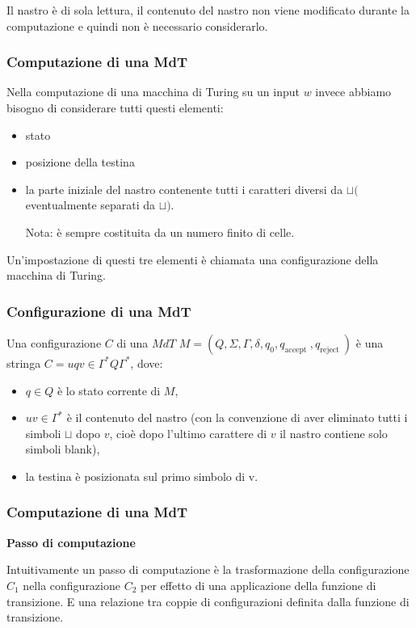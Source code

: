 Il nastro è di sola lettura, il contenuto del nastro non viene modificato durante la computazione e quindi non è necessario considerarlo.

\subsubsection{Computazione di una MdT}

Nella computazione di una macchina di Turing su un input $w$ invece abbiamo bisogno di considerare tutti questi elementi:
\begin{itemize}
    \item stato
    \item posizione della testina
    \item la parte iniziale del nastro contenente tutti i caratteri diversi da $\sqcup($ eventualmente separati da $\sqcup)$.
    
Nota: è sempre costituita da un numero finito di celle.
\end{itemize}

Un'impostazione di questi tre elementi è chiamata una configurazione della macchina di Turing.

\subsubsection{Configurazione di una MdT}

Una configurazione $C$ di una $M d T$
$M=\left(Q, \Sigma, \Gamma, \delta, q_{0}, q_{\text {accept }}, q_{\text {reject }}\right)$ è una stringa
$C=u q v \in \Gamma^{*} Q \Gamma^{*}$, dove:
\begin{itemize}
    \item $q \in Q$ è lo stato corrente di $M$,
    \item $u v \in \Gamma^{*}$ è il contenuto del nastro
(con la convenzione di aver eliminato tutti i simboli $\sqcup$ dopo $v$, cioè dopo l'ultimo carattere di $v$ il nastro contiene solo simboli blank),
    \item la testina è posizionata sul primo simbolo di v.
\end{itemize}

\subsubsection{Computazione di una MdT}

\textbf{Passo di computazione}

Intuitivamente un passo di computazione è la trasformazione della configurazione $C_{1}$ nella configurazione $C_{2}$ per effetto di una applicazione della funzione di transizione.
E una relazione tra coppie di configurazioni definita dalla funzione di transizione.

